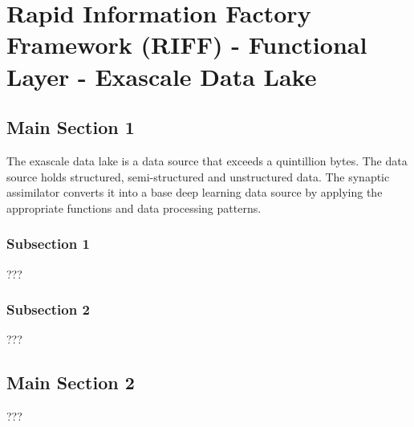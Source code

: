 
\chapter{Rapid Information Factory Framework (RIFF) - Functional Layer - Exascale Data Lake} %

\label{Chapter08} %



\section{Main Section 1}

The exascale data lake is a data source that exceeds a quintillion bytes. The data source holds structured, semi-structured and unstructured data. The synaptic assimilator converts it into a base deep learning data source by applying the appropriate functions and data processing patterns.

\subsection{Subsection 1}

???


\subsection{Subsection 2}

???


\section{Main Section 2}

???
